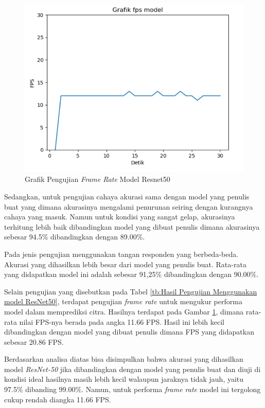 \begin{figure}[!htb]
  \centering
  \includegraphics[scale=0.75]{gambar/pengujian-fps/grafik-pengujian-fps-resnet.png}
  \caption{Grafik Pengujian \emph{Frame Rate} Model Resnet50}
  \label{fig:Grafik Pengujian Frame Rate Model Resnet50}
\end{figure}

Sedangkan, untuk pengujian cahaya akurasi sama dengan model yang penulis buat yang dimana akurasinya mengalami penurunan seiring dengan kurangnya cahaya yang masuk. Namun untuk kondisi yang sangat gelap, akurasinya terhitung lebih baik dibandingkan model yang dibuat penulis dimana akurasinya sebesar 94.5\% dibandingkan dengan 89.00\%.


Pada jenis pengujian menggunakan tangan responden yang berbeda-beda. Akurasi yang dihasilkan lebih besar dari model yang penulis buat. Rata-rata yang didapatkan model ini adalah sebesar 91,25\% dibandingkan dengan 90.00\%.


Selain pengujian yang disebutkan pada Tabel \ref{tb:Hasil Pengujian Menggunakan model ResNet50}, terdapat pengujian \emph{frame rate} untuk mengukur performa model dalam memprediksi citra. Hasilnya terdapat pada Gambar \ref{fig:Grafik Pengujian Frame Rate Model Resnet50}, dimana rata-rata nilai FPS-nya berada pada angka 11.66 FPS. Hasil ini lebih kecil dibandingkan dengan model yang dibuat penulis dimana FPS yang didapatkan sebesar 20.86 FPS. 

Berdasarkan analisa diatas bisa disimpulkan bahwa akurasi yang dihasilkan model \emph{ResNet-50} jika dibandingkan dengan model yang penulis buat dan diuji di kondisi ideal hasilnya masih lebih kecil walaupun jaraknya tidak jauh, yaitu 97.5\% dibanding 99.00\%. Namun, untuk performa \emph{frame rate} model ini tergolong cukup rendah diangka 11.66 FPS. 

